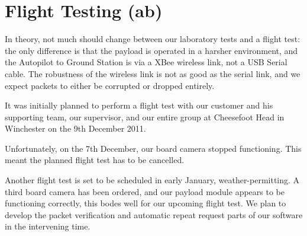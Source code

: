 \section{Flight Testing (ab)}

In theory, not much should change between our laboratory tests and a flight 
test: the only difference is that the payload is operated in a 
harsher environment, and the Autopilot to Ground Station is via a XBee wireless 
link, not a USB Serial cable. The robustness of the wireless link is 
not as good as the serial link, and we expect packets to either be corrupted 
or dropped entirely.

It was initially planned to perform a flight test with our customer and his 
supporting team, our supervisor, and our entire group at Cheesefoot Head in 
Winchester on the 9th December 2011.

Unfortunately, on the 7th December, our board camera stopped functioning. 
This meant the planned flight test has to be cancelled.

Another flight test is set to be scheduled in early January, weather-permitting. 
A third board camera has been ordered, and our payload module appears to be 
functioning correctly, this bodes well for our upcoming flight test. We plan to develop the packet verification and 
automatic repeat request parts of our software in the intervening time.
